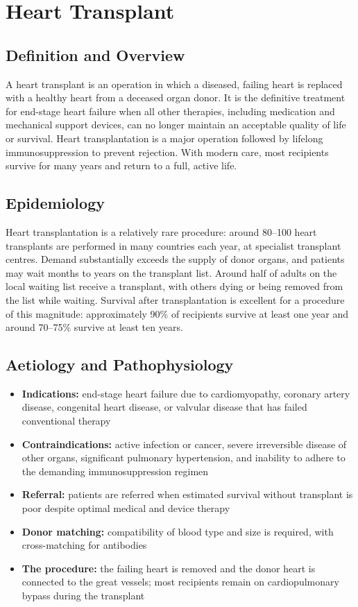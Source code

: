 \chapter{Heart Transplant}

\section*{Definition and Overview}
A heart transplant is an operation in which a diseased, failing heart is replaced with a healthy heart from a deceased organ donor. It is the definitive treatment for end-stage heart failure when all other therapies, including medication and mechanical support devices, can no longer maintain an acceptable quality of life or survival. Heart transplantation is a major operation followed by lifelong immunosuppression to prevent rejection. With modern care, most recipients survive for many years and return to a full, active life.

\section*{Epidemiology}
Heart transplantation is a relatively rare procedure: around 80--100 heart transplants are performed in many countries each year, at specialist transplant centres. Demand substantially exceeds the supply of donor organs, and patients may wait months to years on the transplant list. Around half of adults on the local waiting list receive a transplant, with others dying or being removed from the list while waiting. Survival after transplantation is excellent for a procedure of this magnitude: approximately 90\% of recipients survive at least one year and around 70--75\% survive at least ten years.

\section*{Aetiology and Pathophysiology}
\begin{itemize}
    \item \textbf{Indications:} end-stage heart failure due to cardiomyopathy, coronary artery disease, congenital heart disease, or valvular disease that has failed conventional therapy
    \item \textbf{Contraindications:} active infection or cancer, severe irreversible disease of other organs, significant pulmonary hypertension, and inability to adhere to the demanding immunosuppression regimen
    \item \textbf{Referral:} patients are referred when estimated survival without transplant is poor despite optimal medical and device therapy
    \item \textbf{Donor matching:} compatibility of blood type and size is required, with cross-matching for antibodies
    \item \textbf{The procedure:} the failing heart is removed and the donor heart is connected to the great vessels; most recipients remain on cardiopulmonary bypass during the transplant
\end{itemize}

